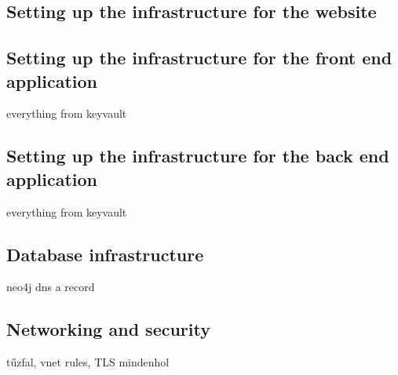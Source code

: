 \subsection{Setting up the infrastructure for the website}

\subsection{Setting up the infrastructure for the front end application}
everything from keyvault

\subsection{Setting up the infrastructure for the back end application}
everything from keyvault

\subsection{Database infrastructure}
\label{section:database}
neo4j dns a record

\subsection{Networking and security}
tűzfal, vnet rules, TLS mindenhol
